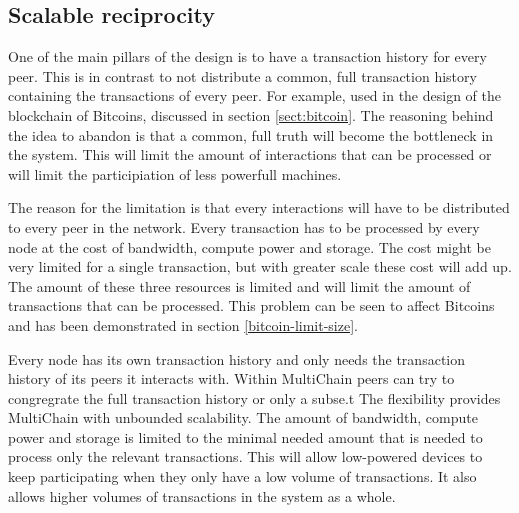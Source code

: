 \subsection{Scalable reciprocity}
\label{sect:scalable-reciprocity}
One of the main pillars of the design is to have a transaction history for every peer.
This is in contrast to not distribute a common, full transaction history containing the transactions of every peer.
For example, used in the design of the blockchain of Bitcoins, discussed in section \ref{sect:bitcoin}.
The reasoning behind the idea to abandon is that a common, full truth
will become the bottleneck in the system.
This will limit the amount of interactions that can be processed
or will limit the participiation of less powerfull machines.

The reason for the limitation is that every interactions will have to be distributed to every peer in the network.
Every transaction has to be processed by every node at the cost of bandwidth, compute power and storage.
The cost might be very limited for a single transaction,
but with greater scale these cost will add up.
The amount of these three resources is limited and will limit the amount of transactions that can be processed.
This problem can be seen to affect Bitcoins and has been demonstrated in section \ref{bitcoin-limit-size}.

Every node has its own transaction history and only needs the transaction history of its peers it interacts with.
Within MultiChain peers can try to congregrate the full transaction history or only a subse.t
The flexibility provides MultiChain with unbounded scalability.
The amount of bandwidth, compute power and storage is limited to the minimal needed amount
that is needed to process only the relevant transactions.
This will allow low-powered devices to keep participating when they only have a low volume of transactions.
It also allows higher volumes of transactions in the system as a whole.